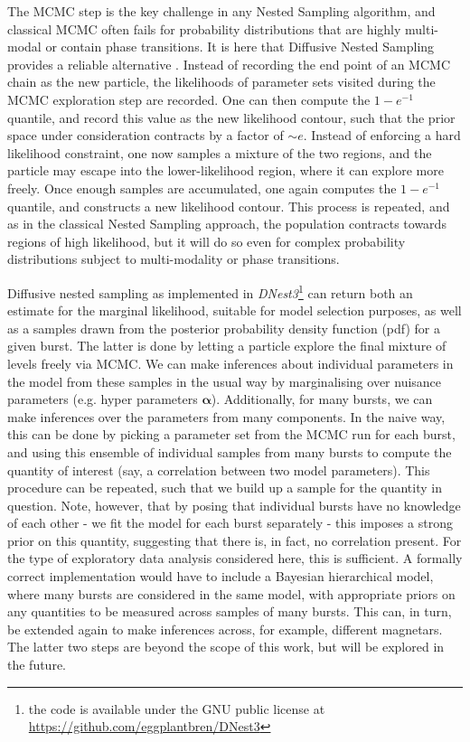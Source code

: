 \documentclass[12pt]{emulateapj}
\begin{document}
The MCMC step is the key challenge in any Nested Sampling algorithm, and classical MCMC often fails for probability distributions that
are highly multi-modal or contain phase transitions. It is here that Diffusive Nested Sampling provides a reliable alternative \citep[for details, see][]{brewer2011}. 
Instead of recording the end point of an MCMC chain as the new particle, the likelihoods of parameter sets visited during the MCMC exploration step
 are recorded. One can then compute the $1-e^{-1}$ quantile, and record this value as the new likelihood contour, such that the prior space
 under consideration contracts by a factor of $\sim e$. Instead of enforcing a hard likelihood constraint, one now samples a mixture of the 
 two regions, and the particle may escape into the lower-likelihood region, where it can explore more freely. Once enough samples are accumulated,
 one again computes the $1-e^{-1}$ quantile, and constructs a new likelihood contour. This process is repeated, and as in the classical Nested Sampling
 approach, the population contracts towards regions of high likelihood, but it will do so even for complex probability distributions subject to multi-modality
 or phase transitions.

Diffusive nested sampling as implemented in {\it DNest3}\footnote{the code is available under the GNU public license at \hyperref[]{https://github.com/eggplantbren/DNest3}} can return both an estimate for the marginal likelihood,
suitable for model selection purposes, as well as a samples drawn from the posterior probability density function (pdf) for a given burst. The latter is done by letting a particle explore
the final mixture of levels freely via MCMC. 
We can make inferences about individual parameters in the model from these samples in the usual way by marginalising over nuisance parameters (e.g. 
hyper parameters $\bm{\alpha}$). Additionally, for many bursts, we can make inferences over the parameters from many components. In the naive way,
this can be done by picking a parameter set from the MCMC run for each burst, and using this ensemble of individual samples from many bursts 
to compute the quantity of interest (say, a correlation between two model parameters). This procedure can be repeated, such that we build up a sample
for the quantity in question. Note, however, that by posing that individual bursts have no knowledge of each other - we fit the model for each burst separately - 
this imposes a strong prior on this quantity, suggesting that there is, in fact, no correlation present. 
For the type of exploratory data analysis considered here, this is sufficient. A formally correct implementation would have to include a Bayesian hierarchical model,
where many bursts are considered in the same model, with appropriate priors on any quantities to be measured across samples of many bursts. This can, in turn,
be extended again to make inferences across, for example, different magnetars. The latter two steps are beyond the scope of this work, but will be explored in the future.
\end{document}
